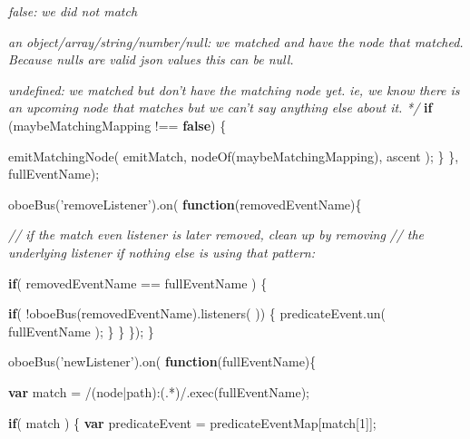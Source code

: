 \documentclass[12pt, ]{article}
\newenvironment{Shaded}{}{}
\newcommand{\KeywordTok}[1]{\textcolor[rgb]{0.00,0.44,0.13}{\textbf{{#1}}}}
\newcommand{\DecValTok}[1]{\textcolor[rgb]{0.25,0.63,0.44}{{#1}}}
\newcommand{\FloatTok}[1]{\textcolor[rgb]{0.25,0.63,0.44}{{#1}}}
\newcommand{\StringTok}[1]{\textcolor[rgb]{0.25,0.44,0.63}{{#1}}}
\newcommand{\CommentTok}[1]{\textcolor[rgb]{0.38,0.63,0.69}{\textit{{#1}}}}
\newcommand{\OtherTok}[1]{\textcolor[rgb]{0.00,0.44,0.13}{{#1}}}
\newcommand{\FunctionTok}[1]{\textcolor[rgb]{0.02,0.16,0.49}{{#1}}}
\newcommand{\NormalTok}[1]{{#1}}
\begin{document}
\begin{Shaded}
\begin{Highlighting}[]
\CommentTok{          false: }
\CommentTok{          we did not match }

\CommentTok{          an object/array/string/number/null: }
\CommentTok{          we matched and have the node that matched.}
\CommentTok{          Because nulls are valid json values this can be null.}

\CommentTok{          undefined:}
\CommentTok{          we matched but don't have the matching node yet.}
\CommentTok{          ie, we know there is an upcoming node that matches but we }
\CommentTok{          can't say anything else about it. }
\CommentTok{          */}
         \KeywordTok{if} \NormalTok{(maybeMatchingMapping !== }\KeywordTok{false}\NormalTok{) \{}

            \FunctionTok{emitMatchingNode}\NormalTok{(}
               \NormalTok{emitMatch, }
               \FunctionTok{nodeOf}\NormalTok{(maybeMatchingMapping), }
               \NormalTok{ascent}
            \NormalTok{);}
         \NormalTok{\}}
      \NormalTok{\}, fullEventName);}
   
      \FunctionTok{oboeBus}\NormalTok{(}\StringTok{'removeListener'}\NormalTok{).}\FunctionTok{on}\NormalTok{( }\KeywordTok{function}\NormalTok{(removedEventName)\{}

         \CommentTok{// if the match even listener is later removed, clean up by removing}
         \CommentTok{// the underlying listener if nothing else is using that pattern:}
      
         \KeywordTok{if}\NormalTok{( removedEventName == fullEventName ) \{}
         
            \KeywordTok{if}\NormalTok{( !}\FunctionTok{oboeBus}\NormalTok{(removedEventName).}\FunctionTok{listeners}\NormalTok{(  )) \{}
               \OtherTok{predicateEvent}\NormalTok{.}\FunctionTok{un}\NormalTok{( fullEventName );}
            \NormalTok{\}}
         \NormalTok{\}}
      \NormalTok{\});   }
   \NormalTok{\}}

   \FunctionTok{oboeBus}\NormalTok{(}\StringTok{'newListener'}\NormalTok{).}\FunctionTok{on}\NormalTok{( }\KeywordTok{function}\NormalTok{(fullEventName)\{}

      \KeywordTok{var} \NormalTok{match = }\OtherTok{/}\FloatTok{(}\OtherTok{node}\FloatTok{|}\OtherTok{path}\FloatTok{)}\OtherTok{:}\FloatTok{(}\OtherTok{.}\FloatTok{*)}\OtherTok{/}\NormalTok{.}\FunctionTok{exec}\NormalTok{(fullEventName);}
      
      \KeywordTok{if}\NormalTok{( match ) \{}
         \KeywordTok{var} \NormalTok{predicateEvent = predicateEventMap[match[}\DecValTok{1}\NormalTok{]];}
                    

\end{Highlighting}
\end{Shaded}
\end{document}
